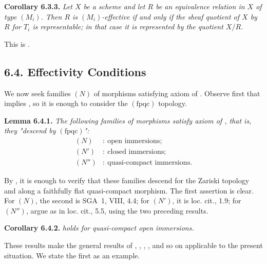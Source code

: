 \medskip
\noindent{}\textbf{Corollary 6.3.3.}
\textit{Let \(X\) be a scheme and let \(R\) be an equivalence relation in
\(X\) of type \((M_i)\). Then \(R\) is \((M_i)\)-effective if and only if
the sheaf quotient of \(X\) by \(R\) for \(T_i\) is representable; in that
case it is represented by the quotient \(X/R\).}

This is .

\subsection*{6.4. Effectivity Conditions}

We now seek families \((N)\) of morphisms satisfying axiom  of
. Observe first that  implies , so it is
enough to consider the \((\mathrm{fpqc})\) topology.

\medskip
\noindent{}\textbf{Lemma 6.4.1.}
\textit{The following families of morphisms satisfy axiom 
of , that is, they "descend by \((\mathrm{fpqc})\)":}
\begin{align*}
 (N)&:\ \text{open immersions};\\
 (N')&:\ \text{closed immersions};\\
 (N'')&:\ \text{quasi-compact immersions}.
\end{align*}

By , it is enough to verify that these families descend for the
Zariski topology and along a faithfully flat quasi-compact morphism. The
first assertion is clear. For \((N)\), the second is SGA~1, VIII, 4.4; for
\((N')\), it is loc. cit., 1.9; for \((N'')\), argue as in loc. cit., 5.5,
using the two preceding results.

\medskip
\noindent{}\textbf{Corollary 6.4.2.}
\textit{ holds for quasi-compact open immersions.}

These results make the general results of , , , , and
so on applicable to the present situation. We state the first as an
example.

